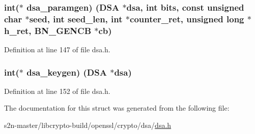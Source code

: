 \subsubsection[{\texorpdfstring{dsa\+\_\+paramgen}{dsa_paramgen}}]{\setlength{\rightskip}{0pt plus 5cm}int($\ast$ dsa\+\_\+paramgen) ({\bf D\+SA} $\ast$dsa, int {\bf bits}, const unsigned char $\ast$seed, int seed\+\_\+len, int $\ast$counter\+\_\+ret, unsigned long $\ast$h\+\_\+ret, {\bf B\+N\+\_\+\+G\+E\+N\+CB} $\ast${\bf cb})}\hypertarget{structdsa__method_a4ae2c5961227983dd669becda8800b86}{}\label{structdsa__method_a4ae2c5961227983dd669becda8800b86}


Definition at line 147 of file dsa.\+h.

\subsubsection[{\texorpdfstring{dsa\+\_\+keygen}{dsa_keygen}}]{\setlength{\rightskip}{0pt plus 5cm}int($\ast$ dsa\+\_\+keygen) ({\bf D\+SA} $\ast$dsa)}\hypertarget{structdsa__method_afe4da32d90e0a058c565f1b6465f57d7}{}\label{structdsa__method_afe4da32d90e0a058c565f1b6465f57d7}


Definition at line 152 of file dsa.\+h.



The documentation for this struct was generated from the following file\+:\begin{DoxyCompactItemize}
\item 
s2n-\/master/libcrypto-\/build/openssl/crypto/dsa/\hyperlink{dsa_8h}{dsa.\+h}\end{DoxyCompactItemize}
